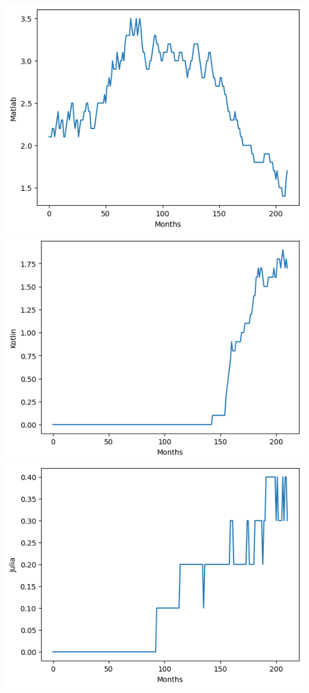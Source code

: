 \documentclass[conference]{IEEEtran}
\begin{document}
\includegraphics[scale=0.4]{lineplot/matlab.png}
\includegraphics[scale=0.4]{lineplot/kotlin.png}
\includegraphics[scale=0.4]{lineplot/julia.png}
\end{document}
